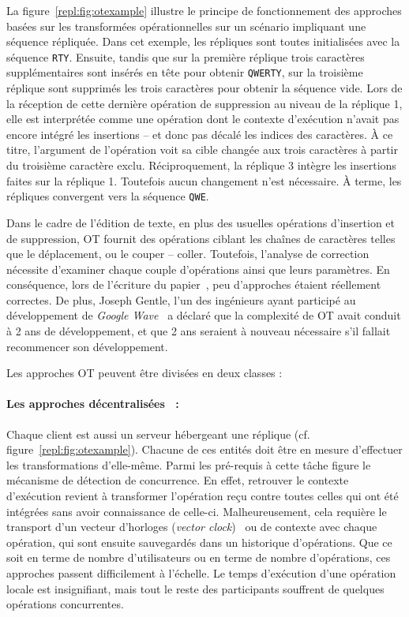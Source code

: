 La figure~\ref{repl:fig:otexample} illustre le principe de fonctionnement des
approches basées sur les transformées opérationnelles sur un scénario impliquant
une séquence répliquée. Dans cet exemple, les répliques sont toutes initialisées
avec la séquence \texttt{RTY}. Ensuite, tandis que sur la première réplique
trois caractères supplémentaires sont insérés en tête pour obtenir
\texttt{QWERTY}, sur la troisième réplique sont supprimés les trois caractères
pour obtenir la séquence vide. Lors de la réception de cette dernière opération
de suppression au niveau de la réplique 1, elle est interprétée comme une
opération dont le contexte d'exécution n'avait pas encore intégré les insertions
-- et donc pas décalé les indices des caractères. À ce titre, l'argument de
l'opération voit sa cible changée aux trois caractères à partir du troisième
caractère exclu. Réciproquement, la réplique 3 intègre les insertions faites sur
la réplique 1. Toutefois aucun changement n'est nécessaire. À terme, les
répliques convergent vers la séquence \texttt{QWE}.

Dans le cadre de l'édition de texte, en plus des usuelles opérations d'insertion
et de suppression, OT fournit des opérations ciblant les chaînes de caractères
telles que le déplacement, ou le couper -- coller. Toutefois, l'analyse de
correction nécessite d'examiner chaque couple d'opérations ainsi que leurs
paramètres. En conséquence, lors de l'écriture du
papier~\cite{imine2003proving}, peu d'approches étaient réellement correctes.
De plus, Joseph Gentle, l'un des ingénieurs ayant participé au développement de
\emph{Google Wave}~\cite{googlewave, kaewkitipong2012diffusion} a déclaré que la
complexité de OT avait conduit à 2 ans de développement, et que 2 ans seraient à
nouveau nécessaire s'il fallait recommencer son développement.

\noindent Les approches OT peuvent être divisées en deux classes :

\paragraph{Les approches décentralisées~\cite{sun2009contextbased} :}
Chaque client est aussi un serveur hébergeant une réplique
(cf. figure~\ref{repl:fig:otexample}). Chacune de ces entités doit être en
mesure d'effectuer les transformations d'elle-même. Parmi les pré-requis à cette
tâche figure le mécanisme de détection de concurrence. En effet, retrouver le
contexte d'exécution revient à transformer l'opération reçu contre toutes celles
qui ont été intégrées sans avoir connaissance de celle-ci. Malheureusement, cela
requière le transport d'un vecteur d'horloges (\emph{vector
  clock})~\cite{lamport1978time} ou de contexte avec chaque opération, qui sont
ensuite sauvegardés dans un historique d'opérations. Que ce soit en terme de
nombre d'utilisateurs ou en terme de nombre d'opérations, ces approches passent
difficilement à l'échelle. Le temps d'exécution d'une opération locale est
insignifiant, mais tout le reste des participants souffrent de quelques
opérations concurrentes.

